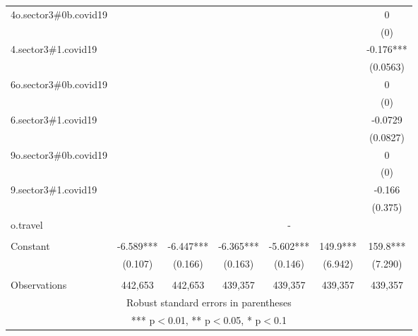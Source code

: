 \documentclass[]{article}
\begin{document}
\begin{tabular}{lcccccc}
4o.sector3\#0b.covid19 &  &  &  &  &  & 0 \\
 &  &  &  &  &  & (0) \\
4.sector3\#1.covid19 &  &  &  &  &  & -0.176*** \\
 &  &  &  &  &  & (0.0563) \\
6o.sector3\#0b.covid19 &  &  &  &  &  & 0 \\
 &  &  &  &  &  & (0) \\
6.sector3\#1.covid19 &  &  &  &  &  & -0.0729 \\
 &  &  &  &  &  & (0.0827) \\
9o.sector3\#0b.covid19 &  &  &  &  &  & 0 \\
 &  &  &  &  &  & (0) \\
9.sector3\#1.covid19 &  &  &  &  &  & -0.166 \\
 &  &  &  &  &  & (0.375) \\
o.travel &  &  &  & - &  &  \\
 &  &  &  &  &  &  \\
Constant & -6.589*** & -6.447*** & -6.365*** & -5.602*** & 149.9*** & 159.8*** \\
 & (0.107) & (0.166) & (0.163) & (0.146) & (6.942) & (7.290) \\
 &  &  &  &  &  &  \\
 Observations & 442,653 & 442,653 & 439,357 & 439,357 & 439,357 & 439,357 \\ \hline
\multicolumn{7}{c}{ Robust standard errors in parentheses} \\
\multicolumn{7}{c}{ *** p$<$0.01, ** p$<$0.05, * p$<$0.1} \\
\end{tabular}
\end{document}
